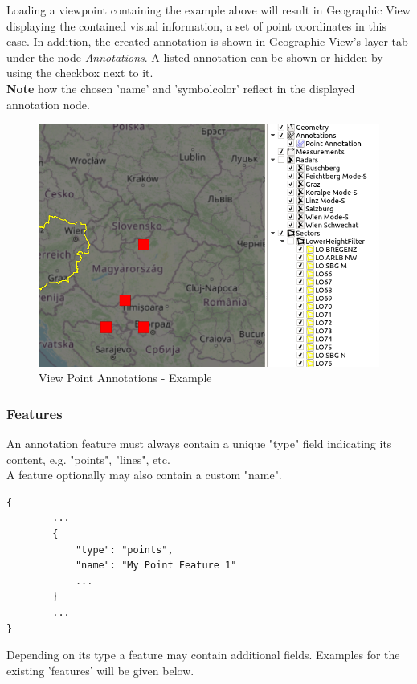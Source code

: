 Loading a viewpoint containing the example above will result in Geographic View displaying the contained visual information,
a set of point coordinates in this case. In addition, the created annotation is shown in Geographic View's layer tab under the node \textit{Annotations}.
A listed annotation can be shown or hidden by using the checkbox next to it. \\

\textbf{Note} how the chosen 'name' and 'symbol\textunderscore color' reflect in the displayed annotation node.

\begin{figure}[H]
    \center
      \includegraphics[width=12cm]{figures/viewpoints_anno_example.png}
    \caption{View Point Annotations - Example} 
\end{figure}

\subsubsection{Features} An annotation feature must always contain a unique "type" field
indicating its content, e.g. "points", "lines", etc. \\

A feature optionally may also contain a custom "name".

\begin{lstlisting}[basicstyle=\small\ttfamily]
{
        ...
        {
            "type": "points",
            "name": "My Point Feature 1"
            ...
        }
        ...
}
\end{lstlisting}

Depending on its type a feature may contain additional fields. Examples for the existing 'features' will be given below.

